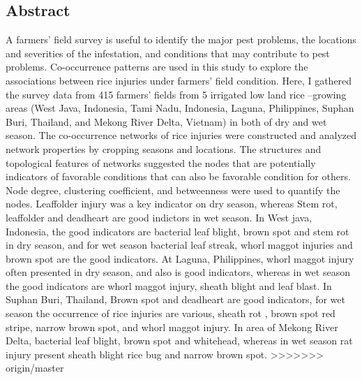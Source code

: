 \subsection{Abstract}
A farmers’ field survey is useful to identify the major pest problems, the locations and severities of the infestation, and conditions that may contribute to pest problems. Co-occurrence patterns are used in this study to explore the associations between rice injuries under farmers’ field condition. Here, I gathered the survey data from 415 farmers’ fields from 5 irrigated low land rice –growing areas (West Java, Indonesia, Tami Nadu, Indonesia, Laguna, Philippines, Suphan Buri, Thailand, and Mekong River Delta, Vietnam) in both of dry and wet season. The co-occurrence networks of rice injuries were constructed and analyzed network properties by cropping seasons and locations. The structures and topological features of networks suggested the nodes that are potentially indicators of favorable conditions that can also be favorable condition for others. Node degree, clustering coefficient, and betweenness were used to quantify the nodes. Leaffolder injury was a key indicator on dry season, whereas Stem rot, leaffolder and deadheart are good indictors in wet season. In West java, Indonesia, the good indicators are bacterial leaf blight, brown spot and stem rot in dry season, and for wet season bacterial leaf streak, whorl maggot injuries and brown spot are the good indicators. At Laguna, Philippines, whorl maggot injury often presented in dry season, and also is good indicators, whereas in wet season the good indicators are whorl maggot injury, sheath blight and leaf blast. In Suphan Buri, Thailand, Brown spot and deadheart are good indicators, for wet season the occurrence of rice injuries are various, sheath rot , brown spot red stripe, narrow brown spot, and whorl maggot injury. In area of Mekong River Delta, bacterial leaf blight, brown spot and whitehead, whereas in wet season rat injury present sheath blight rice bug and narrow brown spot.
>>>>>>> origin/master

